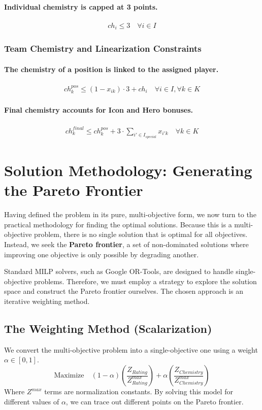 \documentclass{article}
\begin{document}
\paragraph{Individual chemistry is capped at 3 points.}
\begin{gather}
    ch_i \leq 3 \quad \forall i \in I
\end{gather}

\subsubsection{Team Chemistry and Linearization Constraints}
\paragraph{The chemistry of a position is linked to the assigned player.}
\begin{gather}
    ch^{pos}_k \leq (1 - x_{ik}) \cdot 3 + ch_i \quad \forall i \in I, \forall k \in K
\end{gather}
\paragraph{Final chemistry accounts for Icon and Hero bonuses.}
\begin{gather}
    ch^{final}_k \leq ch^{pos}_k + 3 \cdot \sum_{i' \in I_{special}} x_{i'k} \quad \forall k \in K
\end{gather}

\section{Solution Methodology: Generating the Pareto Frontier}
Having defined the problem in its pure, multi-objective form, we now turn to the practical methodology for finding the optimal solutions. Because this is a multi-objective problem, there is no single solution that is optimal for all objectives. Instead, we seek the \textbf{Pareto frontier}, a set of non-dominated solutions where improving one objective is only possible by degrading another.

Standard MILP solvers, such as Google OR-Tools, are designed to handle single-objective problems. Therefore, we must employ a strategy to explore the solution space and construct the Pareto frontier ourselves. The chosen approach is an iterative weighting method.

\subsection{The Weighting Method (Scalarization)}
We convert the multi-objective problem into a single-objective one using a weight $\alpha \in [0, 1]$.
\begin{equation}
\text{Maximize} \quad (1-\alpha) \left( \frac{Z_{Rating}}{Z_{Rating}^{max}} \right) + \alpha \left( \frac{Z_{Chemistry}}{Z_{Chemistry}^{max}} \right)
\end{equation}
Where $Z^{max}$ terms are normalization constants. By solving this model for different values of $\alpha$, we can trace out different points on the Pareto frontier.
\end{document}
